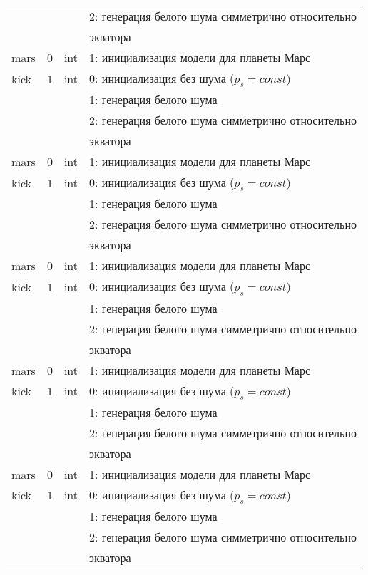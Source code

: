 \begin{longtable*}[c]{|l|c|l|l|}
      &   &     & 2: генерация белого шума симметрично относительно \\
  & & & экватора    \\
 mars & 0 & int & 1: инициализация модели для планеты Марс     \\
kick & 1 & int & 0: инициализация без шума (\(p_s = const\)) \\
      &   &     & 1: генерация белого шума                  \\
      &   &     & 2: генерация белого шума симметрично относительно \\
  & & & экватора    \\
 mars & 0 & int & 1: инициализация модели для планеты Марс     \\
kick & 1 & int & 0: инициализация без шума (\(p_s = const\)) \\
      &   &     & 1: генерация белого шума                  \\
      &   &     & 2: генерация белого шума симметрично относительно \\
  & & & экватора    \\
 mars & 0 & int & 1: инициализация модели для планеты Марс     \\
kick & 1 & int & 0: инициализация без шума (\(p_s = const\)) \\
      &   &     & 1: генерация белого шума                  \\
      &   &     & 2: генерация белого шума симметрично относительно \\
  & & & экватора    \\
 mars & 0 & int & 1: инициализация модели для планеты Марс     \\
kick & 1 & int & 0: инициализация без шума (\(p_s = const\)) \\
      &   &     & 1: генерация белого шума                  \\
      &   &     & 2: генерация белого шума симметрично относительно \\
  & & & экватора    \\
 mars & 0 & int & 1: инициализация модели для планеты Марс     \\
kick & 1 & int & 0: инициализация без шума (\(p_s = const\)) \\
      &   &     & 1: генерация белого шума                  \\
      &   &     & 2: генерация белого шума симметрично относительно \\
  & & & экватора    \\

\end{longtable*}
